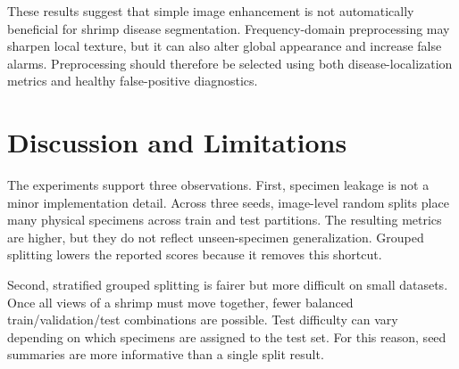 \documentclass{svproc}
\begin{document}
\begin{table}
\caption{Preprocessing and augmentation ablations using YOLO11n-seg under the grouped split.}
\label{tab:preproc_ablation}
\begin{center}
\scriptsize
\setlength{\tabcolsep}{3pt}
\renewcommand{\arraystretch}{1.08}
\end{center}
\end{table}

These results suggest that simple image enhancement is not automatically beneficial for shrimp disease segmentation. Frequency-domain preprocessing may sharpen local texture, but it can also alter global appearance and increase false alarms. Preprocessing should therefore be selected using both disease-localization metrics and healthy false-positive diagnostics.

\section{Discussion and Limitations}

The experiments support three observations. First, specimen leakage is not a minor implementation detail. Across three seeds, image-level random splits place many physical specimens across train and test partitions. The resulting metrics are higher, but they do not reflect unseen-specimen generalization. Grouped splitting lowers the reported scores because it removes this shortcut.

Second, stratified grouped splitting is fairer but more difficult on small datasets. Once all views of a shrimp must move together, fewer balanced train/validation/test combinations are possible. Test difficulty can vary depending on which specimens are assigned to the test set. For this reason, seed summaries are more informative than a single split result.
\end{document}
